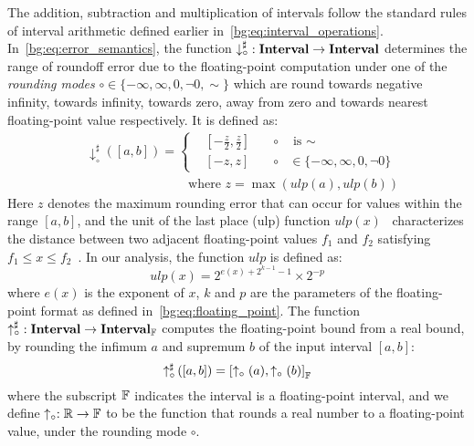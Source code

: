 The addition, subtraction and multiplication of intervals follow
the standard rules of interval arithmetic defined earlier
in~\eqref{bg:eq:interval_operations}.  In~\eqref{bg:eq:error_semantics}, the
function $\operatorname{\downarrow^\sharp_\circ}: \mathbf{Interval} \to \mathbf{Interval}$ determines the range
of roundoff error due to the floating-point computation under one of the
\emph{rounding modes} $\circ \in \{ -\infty, \infty, 0, \neg0, \sim \}$ which
are round towards negative infinity, towards infinity, towards zero, away from
zero and towards nearest floating-point value respectively. It is defined as:
\begin{equation}
    \begin{aligned}
        & \downarrow^\sharp_\circ([a, b]) = \left\{
            \begin{aligned}
                & \left[ -\frac{z}{2}, \frac{z}{2}\right]
                    & \quad \circ & \text{~is~}\sim \\
                & \left[ -z, z\right]
                    & \quad \circ & \in \{ -\infty, \infty, 0, \neg0 \}
            \end{aligned}
        \right. \\
        & \qquad\qquad\qquad\qquad \text{where~} z = \max(ulp(a), ulp(b))
    \end{aligned}
\end{equation}
Here $z$ denotes the maximum rounding error that can occur for values
within the range $[a, b]$, and the unit of the last place (ulp) function
$ulp(x)$~\cite{muller} characterizes the distance between two adjacent
floating-point values $f_1$ and $f_2$ satisfying $f_1 \leq x \leq
f_2$~\cite{goldberg}. In our analysis, the function $ulp$ is defined as:
\begin{equation}
    ulp(x) = 2^{e(x) + 2^{k - 1} - 1} \times 2^{-p}
\end{equation}
where $e(x)$ is the exponent of $x$, $k$ and $p$ are the parameters of the
floating-point format as defined in~\eqref{bg:eq:floating_point}. The function
$\operatorname{\uparrow^\sharp_\circ}: \mathbf{Interval} \to \mathbf{Interval}_\mathbb{F}$ computes the floating-point
bound from a real bound, by rounding the infimum $a$ and supremum $b$ of the
input interval $[a, b]$:
\begin{equation}
    \operatorname{\uparrow^\sharp_\circ}\left(\left[a, b\right]\right)
    = {\left[
        \uparrow_\circ{\left(a\right)},
        \uparrow_\circ{\left(b\right)}
    \right]}_\mathbb{F}
\end{equation}
where the subscript $\mathbb{F}$ indicates the interval is a floating-point
interval, and we define $\uparrow_\circ: \mathbb{R} \to \mathbb{F}$ to be the
function that rounds a real number to a floating-point value, under the
rounding mode $\circ$.


